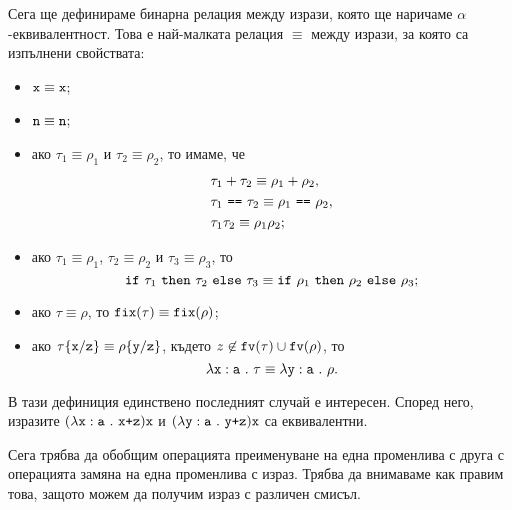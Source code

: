 Сега ще дефинираме бинарна релация между изрази, която ще наричаме $\alpha$-еквивалентност.
Това е най-малката релация $\equiv$ между изрази, за която са изпълнени свойствата:
\begin{itemize}
\item
  $\texttt{x} \equiv \texttt{x}$;
\item
  $\texttt{n} \equiv \texttt{n}$;
\item
  ако $\tau_1 \equiv \rho_1$ и $\tau_2 \equiv \rho_2$, то имаме, че
  \begin{align*}
    & \tau_1 + \tau_2 \equiv \rho_1 + \rho_2,\\
    & \tau_1\ \texttt{==}\ \tau_2 \equiv \rho_1\ \texttt{==}\ \rho_2,\\
    & \tau_1 \tau_2 \equiv \rho_1 \rho_2;
  \end{align*}
\item
  ако $\tau_1 \equiv \rho_1$, $\tau_2 \equiv \rho_2$ и $\tau_3 \equiv \rho_3$, то
  \[\texttt{if}\ \tau_1\ \texttt{then}\ \tau_2\ \texttt{else}\ \tau_3 \equiv \texttt{if}\ \rho_1\ \texttt{then}\ \rho_2\ \texttt{else}\ \rho_3;\]
\item
  ако $\tau \equiv \rho$, то $\texttt{fix}(\tau) \equiv \texttt{fix}(\rho)$;
\item
  ако $\tau\{\texttt{x}/\texttt{z}\} \equiv \rho\{\texttt{y}/\texttt{z}\}$, където $z \not\in \texttt{fv}(\tau) \cup \texttt{fv}(\rho)$, то
  \[\lambda\texttt{x}:\texttt{a}\ .\ {\tau} \equiv \lambda\texttt{y}:\texttt{a}\ .\ {\rho}.\]
\end{itemize}

В тази дефиниция единствено последният случай е интересен.
Според него, изразите $(\lambda\texttt{x}:\texttt{a}\ .\ {\texttt{x+z}})\texttt{x}$ и $(\lambda\texttt{y}:\texttt{a}\ .\ {\texttt{y+z}})\texttt{x}$ са еквивалентни.

Сега трябва да обобщим операцията преименуване на една променлива с друга с
операцията замяна на една променлива с израз.
Трябва да внимаваме как правим това, защото можем да получим
израз с различен смисъл.

